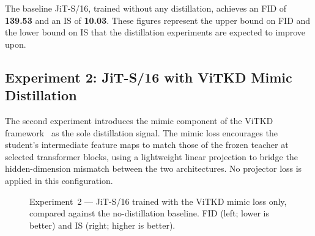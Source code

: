 The baseline JiT-S/16, trained without any distillation, achieves an FID
of \textbf{139.53} and an IS of \textbf{10.03}.
These figures represent the upper bound on FID and the lower bound on IS
that the distillation experiments are expected to improve upon.

\subsection{Experiment 2: JiT-S/16 with ViTKD Mimic Distillation}
\label{subsec:exp2}

The second experiment introduces the mimic component of the ViTKD
framework~\cite{yang2022vitkd} as the sole distillation signal. The mimic
loss encourages the student's intermediate feature maps to match those of
the frozen teacher at selected transformer blocks, using a lightweight
linear projection to bridge the hidden-dimension mismatch between the two
architectures. No projector loss is applied in this configuration.

\begin{figure}[ht]
    \centering
    \begin{subfigure}[b]{0.44\linewidth}
        \centering
    \end{subfigure}
    \hfill
    \begin{subfigure}[b]{0.44\linewidth}
        \centering
    \end{subfigure}
    \caption{Experiment~2 — JiT-S/16 trained with the ViTKD mimic loss
    only, compared against the no-distillation baseline. FID (left; lower
    is better) and IS (right; higher is better).}
    \label{fig:exp2_results}
\end{figure}

